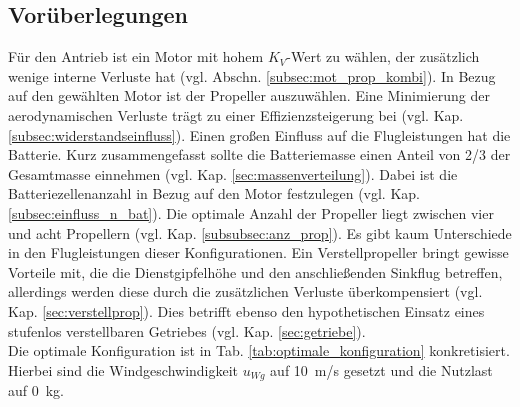 \subsection{Vorüberlegungen}
\label{subsec:vorueberlegung}
Für den Antrieb ist ein Motor mit hohem \ensuremath{K_V}-Wert zu wählen, der zusätzlich wenige interne Verluste hat (vgl. Abschn. \ref{subsec:mot_prop_kombi}). In Bezug auf den gewählten Motor ist der Propeller auszuwählen. Eine Minimierung der aerodynamischen Verluste trägt zu einer Effizienzsteigerung bei (vgl. Kap. \ref{subsec:widerstandseinfluss}). Einen großen Einfluss auf die Flugleistungen hat die Batterie. Kurz zusammengefasst sollte die Batteriemasse einen Anteil von 2/3 der Gesamtmasse einnehmen (vgl. Kap. \ref{sec:massenverteilung}). Dabei ist die Batteriezellenanzahl in Bezug auf den Motor festzulegen (vgl. Kap. \ref{subsec:einfluss_n_bat}).
Die optimale Anzahl der Propeller liegt zwischen vier und acht Propellern (vgl. Kap. \ref{subsubsec:anz_prop}). Es gibt kaum Unterschiede in den Flugleistungen dieser Konfigurationen. Ein Verstellpropeller bringt gewisse Vorteile mit, die die Dienstgipfelhöhe und den anschließenden Sinkflug betreffen, allerdings werden diese durch die zusätzlichen Verluste überkompensiert (vgl. Kap. \ref{sec:verstellprop}). Dies betrifft ebenso den hypothetischen Einsatz eines stufenlos verstellbaren Getriebes (vgl. Kap. \ref{sec:getriebe}). \\
Die optimale Konfiguration ist in Tab. \ref{tab:optimale_konfiguration} konkretisiert. Hierbei sind die Windgeschwindigkeit \ensuremath{u_{Wg}} auf \SI{10}{m/s} gesetzt und die Nutzlast auf \SI{0}{kg}.

